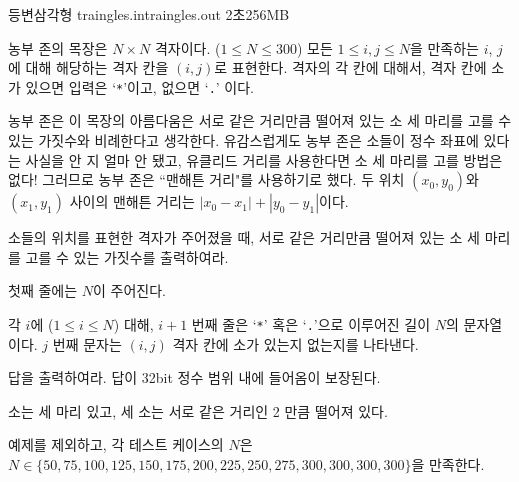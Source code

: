 \begin{problem}{등변삼각형}
	{traingles.in}{traingles.out}
	{2초}{256MB}{}
	
	농부 존의 목장은 $N \times N$ 격자이다. ($1 \le N \le 300$) 모든 $1 \le i, j \le N$을 만족하는 $i$, $j$에 대해 해당하는 격자 칸을 $(i, j)$로 표현한다. 격자의 각 칸에 대해서, 격자 칸에 소가 있으면 입력은 `\texttt{*}'이고, 없으면 `\texttt{.}' 이다. 
	
	농부 존은 이 목장의 아름다움은 서로 같은 거리만큼 떨어져 있는 소 세 마리를 고를 수 있는 가짓수와 비례한다고 생각한다. 유감스럽게도 농부 존은 소들이 정수 좌표에 있다는 사실을 안 지 얼마 안 됐고, 유클리드 거리를 사용한다면 소 세 마리를 고를 방법은 없다! 그러므로 농부 존은 ``맨해튼 거리"를 사용하기로 했다. 두 위치 $(x_0, y_0)$와 $(x_1, y_1)$ 사이의 맨해튼 거리는 $|x_0 - x_1| + |y_0-y_1|$이다.
	
	소들의 위치를 표현한 격자가 주어졌을 때, 서로 같은 거리만큼 떨어져 있는 소 세 마리를 고를 수 있는 가짓수를 출력하여라.
	
	
	\InputFile
	
	첫째 줄에는 $N$이 주어진다.
	
	각 $i$에 ($1 \le i \le N$) 대해, $i+1$ 번째 줄은 `\texttt{*}' 혹은 `\texttt{.}'으로 이루어진 길이 $N$의 문자열이다. $j$ 번째 문자는 $(i, j)$ 격자 칸에 소가 있는지 없는지를 나타낸다.
	
	\OutputFile
	
	답을 출력하여라. 답이 32bit 정수 범위 내에 들어옴이 보장된다.
	
	
	\Example
		
	\begin{example}
	\end{example}

	소는 세 마리 있고, 세 소는 서로 같은 거리인 2 만큼 떨어져 있다.
	
	\Scoring
	
	예제를 제외하고, 각 테스트 케이스의 $N$은 $N \in \{50, 75, 100, 125, 150, 175, 200, 225, 250, 275, 300, 300, 300, 300\}$을 만족한다.
	
	
	
	
	
\end{problem}

